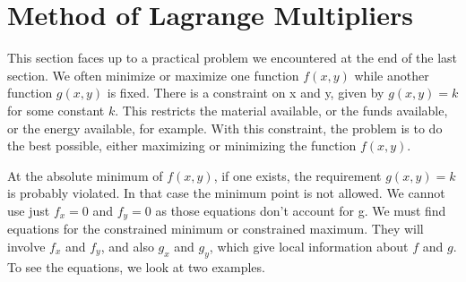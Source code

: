 \section{Method of Lagrange Multipliers}\label{sec:lagrange_multipliers}

This section faces up to a practical problem we encountered at the end of the last section. We often minimize or maximize one function $f(x, y)$ while another function $g(x, y)$ is fixed. There is a constraint on x and y, given by $g(x, y) = k$ for some constant $k$. This restricts the material available, or the funds available, or the energy available, for example. With this constraint, the problem is to do the best possible, either maximizing or minimizing the function $f(x,y)$.

At the absolute minimum of $f(x, y)$, if one exists, the requirement $g(x, y) = k$ is probably violated.
In that case the minimum point is not allowed. We cannot use just $f_x = 0$ and $f_y = 0$ as
those equations don't account for g. We must find equations for the constrained minimum or constrained maximum. They will involve $f_x$ and $f_y$, and also $g_x$ and $g_y$, which give local information about $f$ and $g$. To see the equations, we look at two examples.\\

